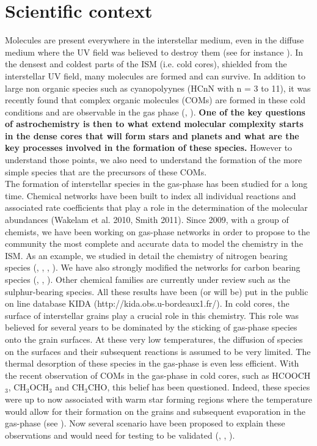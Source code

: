 \section{Scientific context} 


Molecules are present everywhere in the interstellar medium, even in the diffuse medium where the UV field was believed to destroy them (see for instance \cite{2012ApJ...753L..28L}). In the densest and coldest parts of the ISM (i.e. cold cores), shielded from the interstellar UV field, many molecules are formed and can survive. In addition to large non organic species such as cyanopolyynes (HCnN with n = 3 to 11), it was recently found that complex organic molecules (COMs) are formed in these cold conditions and are observable in the gas phase (\cite{Bacmann_2012}, \cite{2014ApJ...795L...2V}). \textbf{One of the key questions of astrochemistry is then to what extend molecular complexity starts in the dense cores that will form stars and planets and what are the key processes involved in the formation of these species.} However to understand those points, we also need to understand the formation of the more simple species that are the precursors of these COMs. \\
The formation of interstellar species in the gas-phase has been studied for a long time. Chemical networks have been built to index all individual reactions and associated rate coefficients that play a role in the determination of the molecular abundances (Wakelam et al. 2010, Smith 2011). Since 2009, with a group of chemists, we have been working on gas-phase networks in order to propose to the community the most complete and accurate data to model the chemistry in the ISM. As an example, we studied in detail the chemistry of nitrogen bearing species (\cite{2013PCCP...1513888D}, \cite{2012PNAS..10910233D}, \cite{2014MNRAS.443..398L}, \cite{2013arXiv1310.4350W}). We have also strongly modified the networks for carbon bearing species (\cite{Wakelam_2009}, \cite{2014MNRAS.437..930L}, \cite{2015MNRAS.453L..48W}). Other chemical families are currently under review such as the sulphur-bearing species. All these results have been (or will be) put in the public on line database KIDA (http://kida.obs.u-bordeaux1.fr/).
In cold cores, the surface of interstellar grains play a crucial role in this chemistry. This role was believed for several years to be dominated by the sticking of gas-phase species onto the grain surfaces. At these very low temperatures, the diffusion of species on the surfaces and their subsequent reactions is assumed to be very limited. The thermal desorption of these species in the gas-phase is even less efficient. With the recent observation of COMs in the gas-phase in cold cores, such as HCOOCH$_3$, CH$_3$OCH$_3$ and CH$_3$CHO, this belief has been questioned. Indeed, these species were up to now associated with warm star forming regions where the temperature would allow for their formation on the grains and subsequent evaporation in the gas-phase (see \cite{Herbst_2009}). Now several scenario have been proposed to explain these observations and would need for testing to be validated (\cite{2013ApJ...769...34V}, \cite{2015MNRAS.449L..16B}, \cite{2015MNRAS.447.4004R}).



